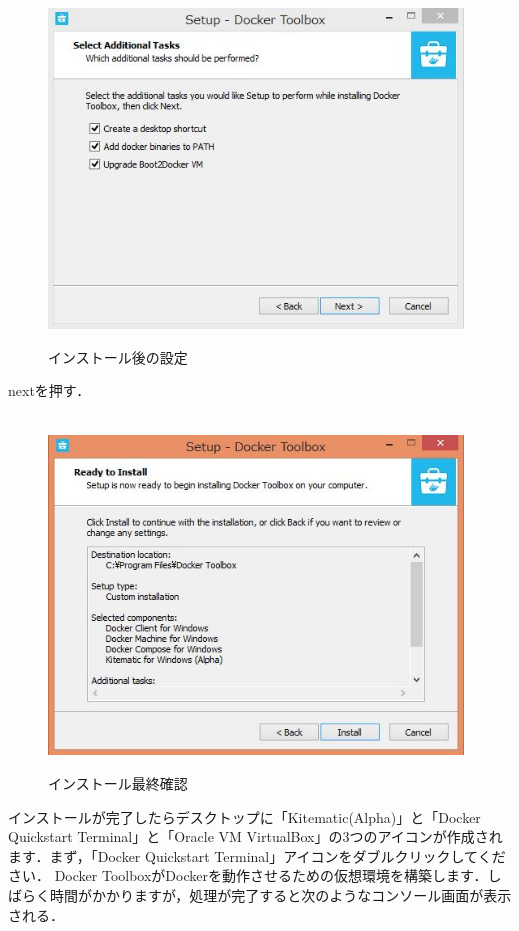 \begin{figure}[htb]
\centering　
\includegraphics[width=11cm]{6.JPG}
\caption{インストール後の設定}\label{tab:uac}
\end{figure}
nextを押す．

\newpage



\begin{figure}[htb]
\centering　
\includegraphics[width=11cm]{7.JPG}
\caption{インストール最終確認}\label{tab:uac}
\end{figure}
インストールが完了したらデスクトップに「Kitematic(Alpha)」と「Docker Quickstart Terminal」と「Oracle VM VirtualBox」の3つのアイコンが作成されます．まず，「Docker Quickstart Terminal」アイコンをダブルクリックしてください．
Docker ToolboxがDockerを動作させるための仮想環境を構築します．しばらく時間がかかりますが，処理が完了すると次のようなコンソール画面が表示される．
\newpage

